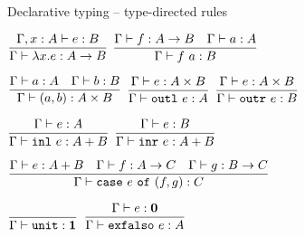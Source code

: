 \documentclass{beamer}
\newcommand{\Fun}[2]{#1 \to #2}
\newcommand{\Prod}[2]{#1 \times #2}
\newcommand{\Sum}[2]{#1 + #2}
\newcommand{\Unit}{\textbf{1}}
\newcommand{\Empty}{\textbf{0}}
\newcommand{\fun}[2]{\lambda #1. #2}
\newcommand{\app}[2]{#1\ #2}
\newcommand{\pair}[2]{(#1, #2)}
\newcommand{\outl}[1][]{\texttt{outl}\ #1}
\newcommand{\outr}[1][]{\texttt{outr}\ #1}
\newcommand{\inl}[1][]{\texttt{inl}\ #1}
\newcommand{\inr}[1][]{\texttt{inr}\ #1}
\newcommand{\case}[3]{\texttt{case}\ #1\ \texttt{of}\ (#2, #3)}
\newcommand{\unit}{\texttt{unit}}
\newcommand{\elimEmpty}[1][]{\texttt{exfalso}\ #1}
\newcommand{\fulltyping}[3]{#1 \vdash #2 : #3}
\newcommand{\typing}[2]{\fulltyping{\Gamma}{#1}{#2}}
\newcommand{\infrule}[3][]{\displaystyle \frac{#2}{#3} \textsc{\footnotesize{#1}}}
\newcommand{\extend}[3]{#1, #2 : #3}
\begin{document}
\begin{frame}{Declarative typing -- type-directed rules}

\begin{center}
  $\infrule{\fulltyping{\extend{\Gamma}{x}{A}}{e}{B}}{\typing{\fun{x}{e}}{\Fun{A}{B}}}$ \quad
  $\infrule{\typing{f}{\Fun{A}{B}} \quad \typing{a}{A}}{\typing{\app{f}{a}}{B}}$

  \vspace{2em}

  $\infrule{\typing{a}{A} \quad \typing{b}{B}}{\typing{\pair{a}{b}}{\Prod{A}{B}}}$ \quad
  $\infrule{\typing{e}{\Prod{A}{B}}}{\typing{\outl[e]}{A}}$ \quad
  $\infrule{\typing{e}{\Prod{A}{B}}}{\typing{\outr[e]}{B}}$

  \vspace{2em}

  $\infrule{\typing{e}{A}}{\typing{\inl[e]}{\Sum{A}{B}}}$ \quad
  $\infrule{\typing{e}{B}}{\typing{\inr[e]}{\Sum{A}{B}}}$

  \vspace{2em}

  $\infrule{\typing{e}{\Sum{A}{B}} \quad \typing{f}{\Fun{A}{C}} \quad \typing{g}{\Fun{B}{C}}}{\typing{\case{e}{f}{g}}{C}}$

  \vspace{2em}

  $\infrule{}{\typing{\unit}{\Unit}}$ \quad
  $\infrule{\typing{e}{\Empty}}{\typing{\elimEmpty[e]}{A}}$
\end{center}

\end{frame}
\end{document}
